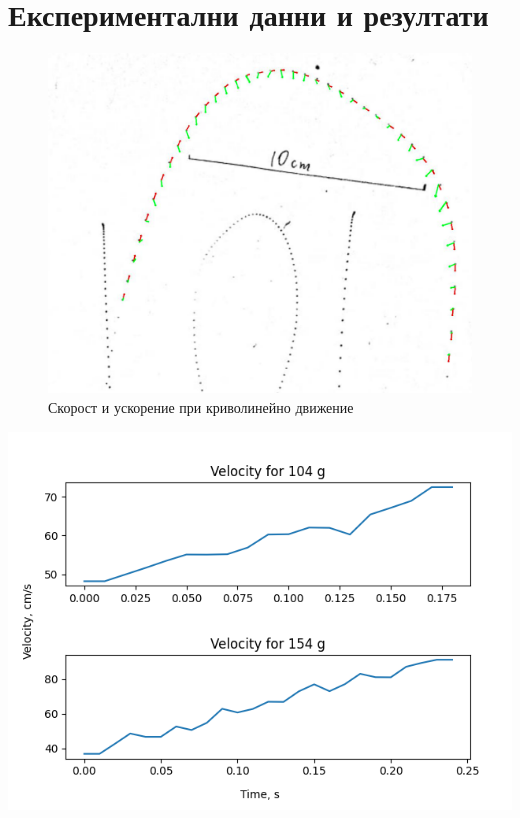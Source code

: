 \documentclass[aps, prb, twocolumn, a4paper, floatfix, reprint]{revtex4-2}
\begin{document}
\section{Експериментални данни и резултати}
\begin{figure}[H]
    \caption{Скорост и ускорение при криволинейно движение}
    \includegraphics[width=0.9\columnwidth,keepaspectratio=true]{cropped_velocity_acceleration.png}
\end{figure}

\includegraphics[width=0.9\columnwidth,keepaspectratio=true]{velocity_charts.png}
\end{document}
